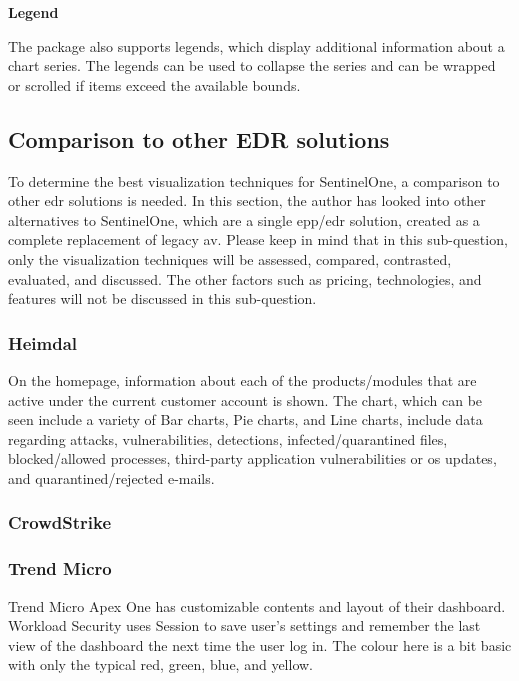 \begin{multicols}{2}
      \textbf{Legend}

      The package also supports legends, which display additional information about a chart series. The legends can be used to
      collapse the series and can be wrapped or scrolled if items exceed the available bounds.

      \subsection{Comparison to other EDR solutions}
      To determine the best visualization techniques for SentinelOne, a comparison to other \acrshort{edr} solutions is needed.
      In this section, the author has looked into other alternatives to SentinelOne, which are a single \acrshort{epp}/\acrshort{edr}
      solution, created as a complete replacement of legacy \acrshort{av}. Please keep in mind that in this sub-question, only the
      visualization techniques will be assessed, compared, contrasted, evaluated, and discussed. The other factors such as pricing,
      technologies, and features will not be discussed in this sub-question.

      \subsubsection{Heimdal\textregistered}

      On the homepage, information about each of the products/modules that are active under the current customer account is shown. The
      chart, which can be seen include a variety of Bar charts, Pie charts, and Line charts, include data regarding attacks,
      vulnerabilities, detections, infected/quarantined files, blocked/allowed processes, third-party application vulnerabilities or
      \acrshort{os} updates, and quarantined/rejected e-mails.

      \subsubsection{CrowdStrike}


      \subsubsection{Trend Micro} %
      Trend Micro Apex One has customizable contents and layout of their dashboard. Workload Security uses Session to save user's
      settings and remember the last view of the dashboard the next time the user log in.
      The colour here is a bit basic with only the typical
      red, green, blue, and yellow.


\end{multicols}
